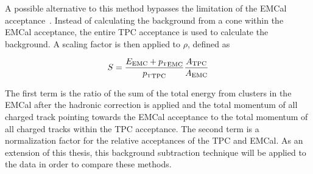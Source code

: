A possible alternative to this method bypasses the limitation of the EMCal acceptance~\cite{anaNoteMConnors}. Instead of calculating the background from a cone within the EMCal acceptance, the entire TPC acceptance is used to calculate the background. A scaling factor is then applied to $\rho$, defined as 

\begin{equation}
    S = \frac{E_{\text{EMC}}+\text{$p_{\mbox{\tiny T}}$}_\text{EMC}}{\text{$p_{\mbox{\tiny T}}$}_\text{TPC}}\frac{A_{\text{TPC}}}{A_{\text{EMC}}}
\end{equation}

\noindent
The first term is the ratio of the sum of the total energy from clusters in the EMCal after the hadronic correction is applied and the total momentum of all charged track pointing towards the EMCal acceptance to the total momentum of all charged tracks within the TPC acceptance. The second term is a normalization factor for the relative acceptances of the TPC and EMCal. As an extension of this thesis, this background subtraction technique will be applied to the \pPb data in order to compare these methods.


